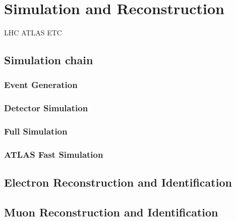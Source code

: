 \chapter{Simulation and Reconstruction}\label{chap:SimReco}
LHC ATLAS ETC
\section{Simulation chain}

\subsection{Event Generation}

\subsection{Detector Simulation}

\subsection{Full Simulation}

\subsection{ATLAS Fast Simulation}

\section{Electron Reconstruction and Identification}

\section{Muon Reconstruction and Identification}

